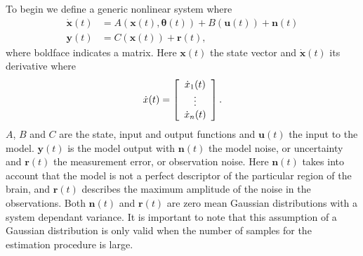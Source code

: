 To begin we define a generic nonlinear system where \begin{align}
\mathbf{\dot{x}}(t) &= A(\mathbf{x}(t),\mathbf{\theta}(t)) + B(\mathbf{u}(t)) + \mathbf{n}(t)\\
\mathbf{y}(t)  &= C(\mathbf{x}(t)) +\mathbf{r}(t),
\end{align} where boldface indicates a matrix. Here $\mathbf{x}(t)$ the state vector and $\dot{\mathbf{x}}(t)$ its derivative where
\[ \dot{x}(t) = \left[ \begin{array}[pos]{c}
\dot{x}_{1}(t)\\
\vdots \\
\dot{x}_{n}(t) \end{array} \right] .\]  $A$, $B$ and $C$ are the state, input and output functions and $\mathbf{u}(t)$ the input to the model. $\mathbf{y}(t)$ is the model output with $\mathbf{n}(t)$ the model noise, or uncertainty and $\mathbf{r}(t)$ the measurement error, or observation noise. Here $\mathbf{n}(t)$ takes into account that the model is not a perfect descriptor of the particular region of the brain, and $\mathbf{r}(t)$ describes the maximum amplitude of the noise in the observations. Both $\mathbf{n}(t)$ and $\mathbf{r}(t)$ are zero mean Gaussian distributions with a system dependant variance. It is important to note that this assumption of a Gaussian distribution is only valid when the number of samples for the estimation procedure is large.

